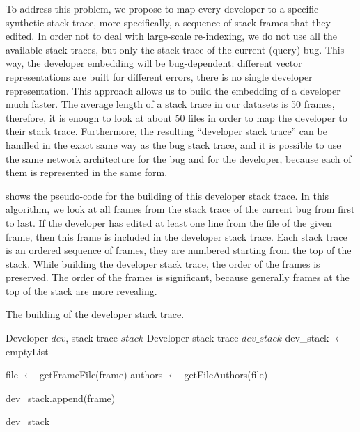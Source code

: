 To address this problem, we propose to map every developer to a specific synthetic stack trace, more specifically, a sequence of stack frames that they edited. In order not to deal with large-scale re-indexing, we do not use all the available stack traces, but only the stack trace of the current (query) bug. This way, the developer embedding will be bug-dependent: different vector representations are built for different errors, there is no single developer representation. This approach allows us to build the embedding of a developer much faster. The average length of a stack trace in our datasets is 50 frames, therefore, it is enough to look at about 50 files in order to map the developer to their stack trace. Furthermore, the resulting ``developer stack trace'' can be handled in the exact same way as the bug stack trace, and it is possible to use the same network architecture for the bug and for the developer, because each of them is represented in the same form. 

 shows the pseudo-code for the building of this developer stack trace. In this algorithm, we look at all frames from the stack trace of the current bug from first to last. If the developer has edited at least one line from the file of the given frame, then this frame is included in the developer stack trace. Each stack trace is an ordered sequence of frames, they are numbered starting from the top of the stack. While building the developer stack trace, the order of the frames is preserved. The order of the frames is significant, because generally frames at the top of the stack are more revealing.

\begin{algorithm}
    \caption{The building of the developer stack trace.}\label{alg:developer-stacktrace}
        \begin{algorithmic}
            \Input Developer $dev$, stack trace $stack$
            \Output Developer stack trace $dev\_stack$
            \State dev\_stack $\gets$ emptyList
            
                \State file $\gets$ getFrameFile(frame)
                \State authors $\gets$ getFileAuthors(file)
                
                    dev\_stack.append(frame) 
                \EndIf
                
            \EndFor
            \Return dev\_stack
        \end{algorithmic}
\end{algorithm}

